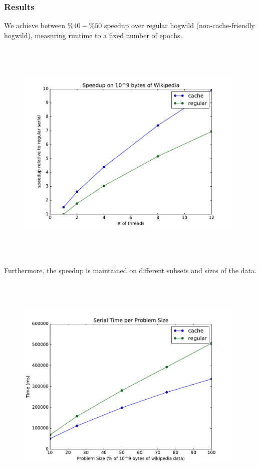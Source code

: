 \documentclass[times,11pt]{article}
\numberwithin{equation}{section}		%
\numberwithin{figure}{section}			%
\numberwithin{table}{section}				%
\begin{document}
\subsubsection{Results}
We achieve between $\%40-\%50$ speedup over regular hogwild (non-cache-friendly hogwild),
measuring runtime to a fixed number of epochs.
\begin{figure}[H]
\includegraphics[width=11cm,height=11cm,keepaspectratio]{w2v_speedup_plot.pdf}
\end{figure}
Furthermore, the speedup is maintained on different subsets and sizes of the data.
\begin{figure}[H]
\begin{center}
\includegraphics[width=11cm,height=11cm,keepaspectratio]{w2v_problem_size_time_plot.pdf}
\end{center}
\end{figure}
\end{document}
